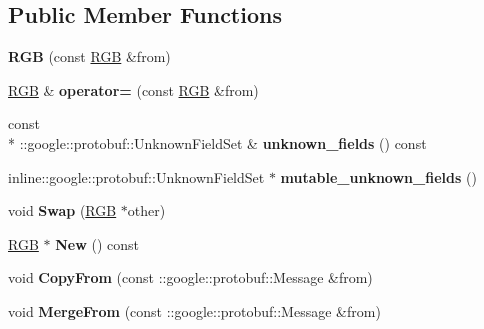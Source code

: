 \subsection*{Public Member Functions}
\begin{DoxyCompactItemize}
\item 
\hypertarget{classvss__state_1_1RGB_ad057f22713ee486fa88d59661f15c390}{{\bfseries R\-G\-B} (const \hyperlink{classvss__state_1_1RGB}{R\-G\-B} \&from)}\label{classvss__state_1_1RGB_ad057f22713ee486fa88d59661f15c390}

\item 
\hypertarget{classvss__state_1_1RGB_ae6850f3550d012f10cb3fe961ceca13a}{\hyperlink{classvss__state_1_1RGB}{R\-G\-B} \& {\bfseries operator=} (const \hyperlink{classvss__state_1_1RGB}{R\-G\-B} \&from)}\label{classvss__state_1_1RGB_ae6850f3550d012f10cb3fe961ceca13a}

\item 
\hypertarget{classvss__state_1_1RGB_af3633b5c052c9b983f03dca86c5172e3}{const \\*
\-::google\-::protobuf\-::\-Unknown\-Field\-Set \& {\bfseries unknown\-\_\-fields} () const }\label{classvss__state_1_1RGB_af3633b5c052c9b983f03dca86c5172e3}

\item 
\hypertarget{classvss__state_1_1RGB_adfdaca9126b92f913d030d86975fb390}{inline\-::google\-::protobuf\-::\-Unknown\-Field\-Set $\ast$ {\bfseries mutable\-\_\-unknown\-\_\-fields} ()}\label{classvss__state_1_1RGB_adfdaca9126b92f913d030d86975fb390}

\item 
\hypertarget{classvss__state_1_1RGB_a42f05e54d0dc837400c5079899b463aa}{void {\bfseries Swap} (\hyperlink{classvss__state_1_1RGB}{R\-G\-B} $\ast$other)}\label{classvss__state_1_1RGB_a42f05e54d0dc837400c5079899b463aa}

\item 
\hypertarget{classvss__state_1_1RGB_a275dd9a86123627063addbde4feb117c}{\hyperlink{classvss__state_1_1RGB}{R\-G\-B} $\ast$ {\bfseries New} () const }\label{classvss__state_1_1RGB_a275dd9a86123627063addbde4feb117c}

\item 
\hypertarget{classvss__state_1_1RGB_a7dca7dca78106990bae0191f4fc58aa3}{void {\bfseries Copy\-From} (const \-::google\-::protobuf\-::\-Message \&from)}\label{classvss__state_1_1RGB_a7dca7dca78106990bae0191f4fc58aa3}

\item 
\hypertarget{classvss__state_1_1RGB_a6b287c534b5414da22c85a7ace395032}{void {\bfseries Merge\-From} (const \-::google\-::protobuf\-::\-Message \&from)}\label{classvss__state_1_1RGB_a6b287c534b5414da22c85a7ace395032}


\end{DoxyCompactItemize}
